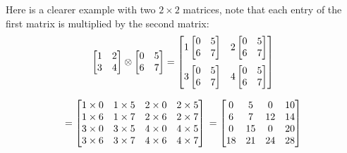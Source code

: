Here is a clearer example with two $2\times2$ matrices, note that each entry of the first matrix is multiplied by the second matrix:
\begin{equation*}
\begin{bmatrix}
	1 & 2 \\
	3 & 4 \\
\end{bmatrix} \otimes
\begin{bmatrix}
	0 & 5 \\
	6 & 7 \\
\end{bmatrix} =
\begin{bmatrix}
1 \begin{bmatrix}
	0 & 5 \\
	6 & 7 \\
\end{bmatrix} & 
2 \begin{bmatrix}
	0 & 5 \\
	6 & 7 \\
\end{bmatrix} \vspace{6pt} \\ 

3 \begin{bmatrix}
	0 & 5 \\
	6 & 7 \\
\end{bmatrix} & 
4 \begin{bmatrix}
	0 & 5 \\
	6 & 7 \\
\end{bmatrix}
\end{bmatrix}
\end{equation*}

\begin{equation*}
	= 
\begin{bmatrix}
1\times 0 & 1\times 5 & 2\times 0 & 2\times 5 \\
1\times 6 & 1\times 7 & 2\times 6 & 2\times 7 \\
3\times 0 & 3\times 5 & 4\times 0 & 4\times 5 \\
3\times 6 & 3\times 7 & 4\times 6 & 4\times 7 \\
\end{bmatrix} \\
= 
\begin{bmatrix}
0 &  5 &  0 & 10 \\
6 &  7 & 12 & 14 \\
0 & 15 &  0 & 20 \\
18 & 21 & 24 & 28
\end{bmatrix}
\end{equation*}

